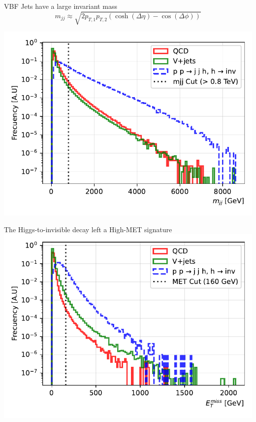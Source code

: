 \documentclass{../../bredelebeamer}
\begin{document}
\begin{frame}{VBF Jets have a large invariant mass}
    $$
    m_{jj} \approx \sqrt{2 p_{T,1} p_{T,2} \left( \cosh(\Delta\eta) - \cos(\Delta\phi) \right)}
    $$
    \begin{minipage}{0.95\textwidth}
        \includegraphics[width=\textwidth]{../Images/dijet_mass_comparison.pdf}
    \end{minipage}
\end{frame}


\begin{frame}{The Higgs-to-invisible decay left a High-MET signature}
    \includegraphics[width=\textwidth]{../Images/met_comparison.pdf}
\end{frame}
\end{document}
